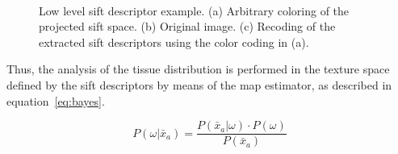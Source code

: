 \documentclass[a4paper, 10pt, conference]{llncs}      %
\begin{document}
\begin{figure}[Htbp]
\centering
{}~
\,
\caption{Low level \ac{sift} descriptor example. (a) Arbitrary coloring of the projected \acs{sift} space. (b) Original image. (c) Recoding of the extracted \ac{sift} descriptors using the color coding in (a). }
\label{fig:siftImg}
\end{figure}

Thus, the analysis of the tissue distribution is performed in the texture space defined by the \ac{sift} descriptors by means of the \ac{map} estimator, as described in equation~\ref{eq:bayes}.%

\begin{equation}
P(\omega|\bar{x}_a) = \frac{P(\bar{x}_a|\omega)\cdot P(\omega)}{P(\bar{x}_a)}
\label{eq:bayes}
\end{equation}
\end{document}
